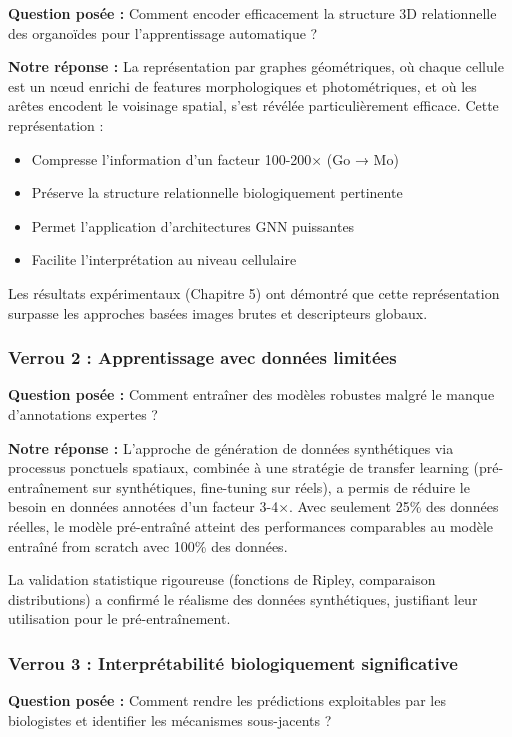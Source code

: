 \textbf{Question posée :} Comment encoder efficacement la structure 3D relationnelle des organoïdes pour l'apprentissage automatique ?

\textbf{Notre réponse :}
La représentation par graphes géométriques, où chaque cellule est un nœud enrichi de features morphologiques et photométriques, et où les arêtes encodent le voisinage spatial, s'est révélée particulièrement efficace. Cette représentation :
\begin{itemize}
    \item Compresse l'information d'un facteur 100-200× (Go → Mo)
    \item Préserve la structure relationnelle biologiquement pertinente
    \item Permet l'application d'architectures GNN puissantes
    \item Facilite l'interprétation au niveau cellulaire
\end{itemize}

Les résultats expérimentaux (Chapitre 5) ont démontré que cette représentation surpasse les approches basées images brutes et descripteurs globaux.

\subsubsection{Verrou 2 : Apprentissage avec données limitées}

\textbf{Question posée :} Comment entraîner des modèles robustes malgré le manque d'annotations expertes ?

\textbf{Notre réponse :}
L'approche de génération de données synthétiques via processus ponctuels spatiaux, combinée à une stratégie de transfer learning (pré-entraînement sur synthétiques, fine-tuning sur réels), a permis de réduire le besoin en données annotées d'un facteur 3-4×. Avec seulement 25\% des données réelles, le modèle pré-entraîné atteint des performances comparables au modèle entraîné from scratch avec 100\% des données.

La validation statistique rigoureuse (fonctions de Ripley, comparaison distributions) a confirmé le réalisme des données synthétiques, justifiant leur utilisation pour le pré-entraînement.

\subsubsection{Verrou 3 : Interprétabilité biologiquement significative}

\textbf{Question posée :} Comment rendre les prédictions exploitables par les biologistes et identifier les mécanismes sous-jacents ?

